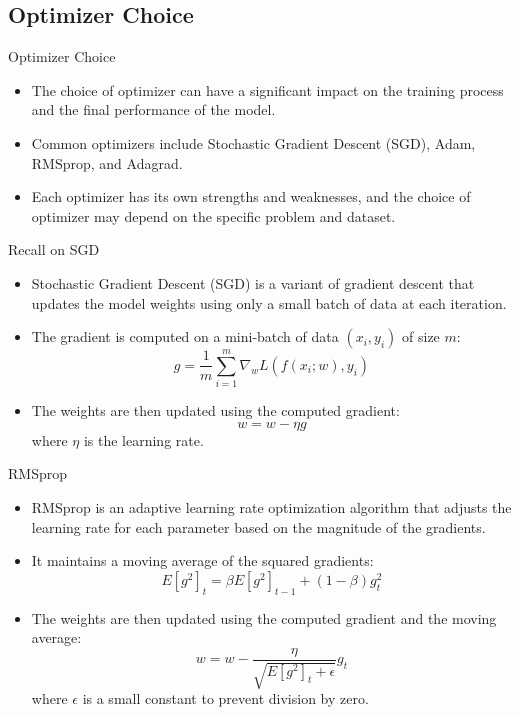 \subsection{Optimizer Choice}
\begin{frame}{}{Optimizer Choice}
    \begin{itemize}
        \item The choice of optimizer can have a significant impact on the training process and the final performance of the model.
        \item Common optimizers include Stochastic Gradient Descent (SGD), Adam, RMSprop, and Adagrad.
        \item Each optimizer has its own strengths and weaknesses, and the choice of optimizer may depend on the specific problem and dataset.
    \end{itemize}
\end{frame}

\begin{frame}{}{Recall on SGD}
    \begin{itemize}
        \item Stochastic Gradient Descent (SGD) is a variant of gradient descent that updates the model weights using only a small batch of data at each iteration.
        \item The gradient is computed on a mini-batch of data {$(x_i, y_i)$} of size $m$:
              \[
                  g = \frac{1}{m} \sum_{i=1}^{m} \nabla_w L(f(x_i; w), y_i)
              \]
        \item The weights are then updated using the computed gradient:
              \[
                  w = w - \eta g
              \]
              where $\eta$ is the learning rate.
    \end{itemize}
\end{frame}

\begin{frame}{}{RMSprop}
    \begin{itemize}
        \item RMSprop is an adaptive learning rate optimization algorithm that adjusts the learning rate for each parameter based on the magnitude of the gradients.
        \item It maintains a moving average of the squared gradients:
              \[
                  E[g^2]_t = \beta E[g^2]_{t-1} + (1 - \beta) g_t^2
              \]
        \item The weights are then updated using the computed gradient and the moving average:
              \[
                  w = w - \frac{\eta}{\sqrt{E[g^2]_t + \epsilon}} g_t
              \]
              where $\epsilon$ is a small constant to prevent division by zero.
    \end{itemize}
\end{frame}

